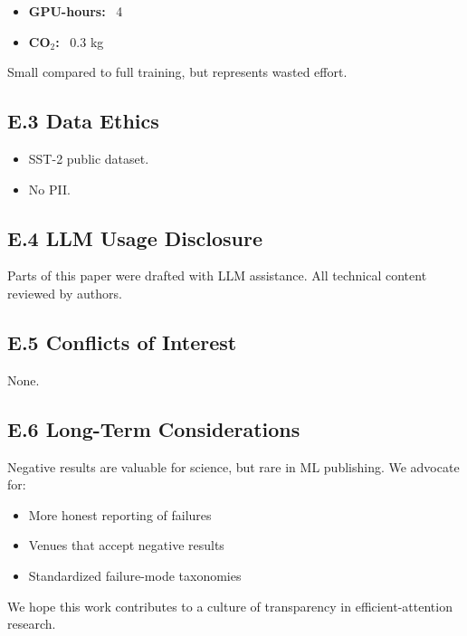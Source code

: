 \begin{itemize}
\item \textbf{GPU-hours:} ~4
\item \textbf{CO$_2$:} ~0.3 kg

\end{itemize}
Small compared to full training, but represents wasted effort.

\subsection{E.3 Data Ethics}

\begin{itemize}
\item SST-2 public dataset.
\item No PII.

\end{itemize}
\subsection{E.4 LLM Usage Disclosure}

Parts of this paper were drafted with LLM assistance. All technical content 
reviewed by authors.

\subsection{E.5 Conflicts of Interest}

None.

\subsection{E.6 Long-Term Considerations}

Negative results are valuable for science, but rare in ML publishing. 
We advocate for:

\begin{itemize}
\item More honest reporting of failures
\item Venues that accept negative results
\item Standardized failure-mode taxonomies

\end{itemize}
We hope this work contributes to a culture of transparency in 
efficient-attention research.

